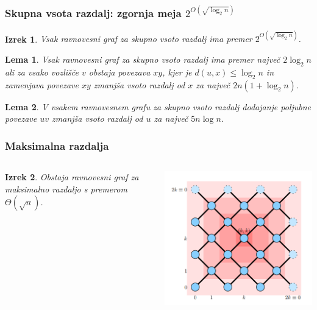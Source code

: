 \documentclass[12pt, hyperref={unicode}]{beamer}
\newtheorem{izrek}{Izrek}
\newtheorem{lema}{Lema}
\begin{document}
\begin{frame}
   
  \frametitle{Skupna vsota razdalj: zgornja meja $2^{O(\sqrt{\log_2 n})}$}
  \begin{izrek}
    Vsak ravnovesni graf za skupno vsoto razdalj ima premer $2^{O(\sqrt{\log_2 n})}$.
  \end{izrek}

  \begin{lema}
    Vsak ravnovesni graf za skupno vsoto razdalj ima premer največ $2 \log_2 n$ ali
    za vsako vozlišče $v$ obstaja povezava $xy$, kjer je $d(u, x) \leq \log_2 n$ in
    zamenjava povezave $xy$ zmanjša vsoto razdalj od $x$ za največ $2n(1 + \log_2 n)$.
  \end{lema}

  \begin{lema}
    V vsakem ravnovesnem grafu za skupno vsoto razdalj dodajanje poljubne povezave
    $uv$ zmanjša vsoto razdalj od $u$ za največ $5n \log n$.
  \end{lema}

\end{frame}

\begin{frame}

  \frametitle{Maksimalna razdalja}
  \begin{columns}
    \begin{izrek}
        Obstaja ravnovesni graf za maksimalno razdaljo s premerom $\Theta(\sqrt{n})$.
    \end{izrek}
    \includegraphics[width=1\textwidth]{Plagiat.png}
  \end{columns}
  
  

\end{frame}
\end{document}
